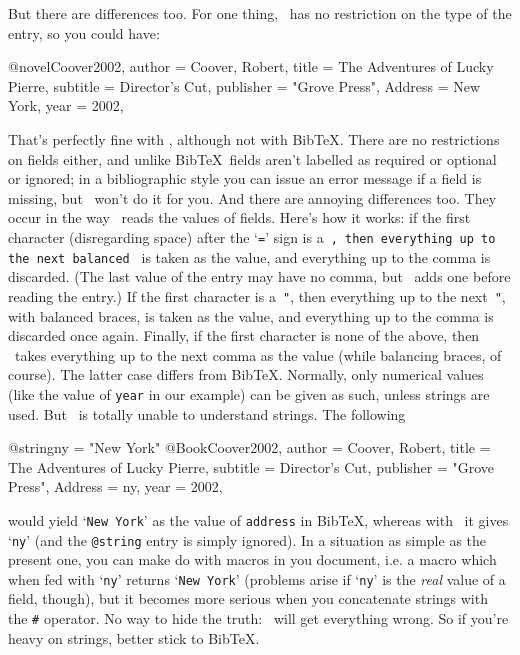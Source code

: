 But there are differences too. For one thing, \lib\ has no restriction on the type
of the entry, so you could have:

\verbatim
@novel{Coover2002,
  author = {Coover, Robert},
  title = {The Adventures of Lucky Pierre},
  subtitle = {Director's Cut},
  publisher = "Grove Press",
  Address = {New York},
  year = 2002,
}
\endverbatim

\noindent That's perfectly fine with \lib, although not with Bib\TeX.
There are no restrictions on fields either, and unlike Bib\TeX\ fields
aren't labelled as required or optional or ignored; in a bibliographic
style you can issue an error message if a field is missing, but \lib\
won't do it for you. And there are
annoying differences too. They occur in the way \lib\ reads the values of
fields. Here's how it works: if the first character (disregarding space) after
the `\texttt{=}' sign is a~\texttt{\string{}, then everything up to the next
balanced~\texttt{\string}} is taken as the value, and everything up to the comma
is discarded. (The last value of the entry may have no comma, but \lib\ adds one
before reading the entry.) If the first character is a~\texttt{\string"}, then
everything up to the next~\texttt{\string"}, with balanced braces, is taken
as the value, and everything up to the comma is discarded once again. Finally,
if the first character is none of the above, then \lib\ takes everything up
to the next comma as the value (while balancing braces, of course). The latter
case differs from Bib\TeX. Normally, only numerical values (like the value of
\texttt{year} in our example) can be given as such, unless strings are used.
But \lib\ is totally unable to understand strings. The following

\verbatim
@string{ny = "New York"}
@Book{Coover2002,
  author = {Coover, Robert},
  title = {The Adventures of Lucky Pierre},
  subtitle = {Director's Cut},
  publisher = "Grove Press",
  Address = ny,
  year = 2002,
}
\endverbatim

\noindent would yield `\texttt{New York}' as the value of \texttt{address} in
Bib\TeX, whereas with \lib\ it gives `\texttt{ny}' (and the \texttt{@string}
entry is simply ignored). In a situation as simple as the present one, you can
make do with macros in you document, i.e. a macro which when fed with `\texttt{ny}'
returns `\texttt{New York}' (problems arise if `\texttt{ny}' is the \textit{real}
value of a field, though), but it becomes more serious when you concatenate strings
with the \texttt{\string#} operator. No way to hide the truth: \lib\ will get
everything wrong. So if you're heavy on strings, better stick to Bib\TeX.







